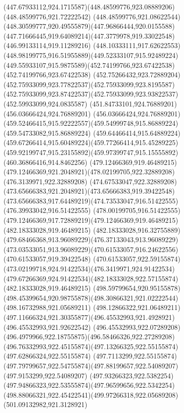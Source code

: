 {{{{				\curveto(447.67933112,924.1715587)(448.48599776,923.08889206)(448.48599776,921.72222542)
				\curveto(448.48599776,921.08622544)(448.30599777,920.49555879)(447.96866444,920.0155588)
				\curveto(447.71666445,919.64089214)(447.3779978,919.33022548)(446.99133114,919.11289216)
				\curveto(448.10333111,917.62622553)(448.98199775,916.51955889)(449.52333107,915.92489224)
				\curveto(449.55933107,915.9875589)(452.74199766,923.67422538)(452.74199766,923.67422538)
				\curveto(452.75266432,923.72889204)(452.75933099,923.77822537)(452.75933099,923.8195587)
				\curveto(452.75933099,923.87422537)(452.75933099,923.93822537)(452.59933099,924.0835587)
				\lineto(451.84733101,924.76889201)
				\lineto(456.03666424,924.76889201)
				\curveto(456.03666424,924.76889201)(459.52466415,915.92222557)(459.54999748,915.86889224)
				\lineto(459.54733082,915.86889224)
				\curveto(459.64466414,915.64889224)(459.67266414,915.60489224)(459.77266414,915.45289225)
				\curveto(459.92199747,915.23155892)(459.97399747,915.15555892)(460.36866416,914.8462256)
				\moveto(479.12466369,919.46489215)
				\curveto(479.12466369,921.2048921)(478.02199705,922.32889208)(476.3139971,922.32889208)
				\curveto(474.67533047,922.32889208)(473.65666383,921.2048921)(473.65666383,919.39422548)
				\curveto(473.65666383,917.64489219)(474.73533047,916.51422555)(476.39933042,916.51422555)
				\curveto(478.00199705,916.51422555)(479.12466369,917.72889219)(479.12466369,919.46489215)
				\moveto(482.18333028,919.46489215)
				\curveto(482.18333028,916.32755889)(479.68466368,913.96089229)(476.37133043,913.96089229)
				\curveto(473.03533051,913.96089229)(470.61533057,916.24622556)(470.61533057,919.39422548)
				\curveto(470.61533057,922.59155874)(473.02199718,924.91422534)(476.3419971,924.91422534)
				\curveto(479.67266369,924.91422534)(482.18333028,922.57155874)(482.18333028,919.46489215)
				\moveto(498.59799654,920.95155878)
				\curveto(498.45399654,920.98755878)(498.30866321,921.02222544)(498.16732988,921.05689211)
				\lineto(498.12866322,921.06489211)
				\curveto(497.11666324,921.30355877)(496.45532993,921.4928921)(496.45532993,921.92622542)
				\curveto(496.45532993,922.07289208)(496.4979966,922.18755875)(496.58466326,922.27289208)
				\curveto(496.76332993,922.45155874)(497.13266325,922.55155874)(497.62866324,922.55155874)
				\curveto(497.7113299,922.55155874)(497.79799657,922.54755874)(497.88199657,922.54089207)
				\lineto(497.9153299,922.54089207)
				\curveto(497.93266323,922.5382254)(497.94866323,922.53555874)(497.96599656,922.5342254)
				\curveto(498.88066321,922.45422541)(499.97266318,922.05689208)(501.09132982,921.3128921)
}}}}
